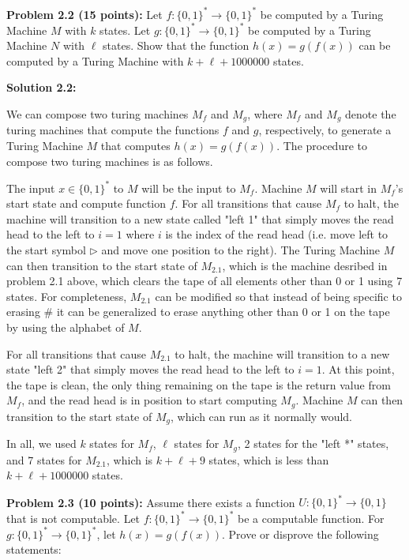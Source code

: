 \documentclass[11pt]{article}
\begin{document}
\newpage


\textbf{Problem 2.2 (15 points):} Let $f:\{0,1\}^* \to \{0,1\}^*$ be computed by a Turing Machine $M$ with $k$ states. Let $g: \{0,1\}^* \to \{0,1\}^*$ be computed by a Turing Machine $N$ with $\ell$ states. Show that the function $h(x) = g(f(x))$ can be computed by a Turing Machine with $k+\ell + 1000000$ states. 

\textbf{Solution 2.2:} 

We can compose two turing machines $M_f$ and $M_g$, where $M_f$ and $M_g$ denote the turing machines that compute the functions $f$ and $g$, respectively, to generate a Turing Machine $M$ that computes $h(x) = g(f(x))$. The procedure to compose two turing machines is as follows.

The input $x \in \{0, 1\}^*$ to $M$ will be the input to $M_f$. Machine $M$ will start in $M_f$'s start state and compute function $f$. For all transitions that cause $M_f$ to halt, the machine will transition to a new state called "left 1" that simply moves the read head to the left to $i=1$ where $i$ is the index of the read head (i.e. move left to the start symbol $\triangleright$ and move one position to the right). The Turing Machine $M$ can then transition to the start state of $M_{2.1}$, which is the machine desribed in problem 2.1 above, which clears the tape of all elements other than 0 or 1 using 7 states. For completeness, $M_{2.1}$ can be modified so that instead of being specific to erasing $\#$ it can be generalized to erase anything other than 0 or 1 on the tape by using the alphabet of $M$.

For all transitions that cause $M_{2.1}$ to halt, the machine will transition to a new state "left 2" that simply moves the read head to the left to $i=1$. At this point, the tape is clean, the only thing remaining on the tape is the return value from $M_f$, and the read head is in position to start computing $M_g$. Machine $M$ can then transition to the start state of $M_g$, which can run as it normally would.

In all, we used $k$ states for $M_f$, $\ell$ states for $M_g$, 2 states for the "left *" states, and 7 states for $M_{2.1}$, which is $k + \ell + 9$ states, which is less than $k+\ell + 1000000$ states.



\pagebreak

\textbf{Problem 2.3 (10 points):} Assume there exists a function $U:\{0,1\}^* \to \{0,1\}$ that is not computable. Let $f:\{0,1\}^*\to \{0,1\}^*$ be a computable function. For $g:\{0,1\}^* \to \{0,1\}^*$, let $h(x) = g(f(x))$. Prove or disprove the following statements:
\end{document}
